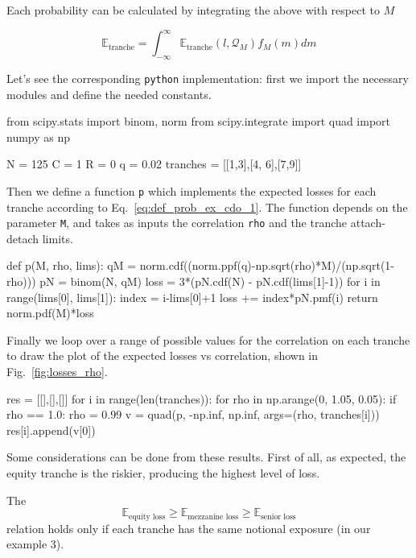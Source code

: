 Each probability can be calculated by integrating the above with respect to $M$
	
\begin{equation} 
\mathbb{E}_{\mathrm{tranche}} = \int_{-\infty}^{\infty}{\mathbb{E}_{\mathrm{tranche}}(l, \mathcal{Q}_M) f_M(m)dm}
\end{equation}

Let's see the corresponding \texttt{python} implementation: first we import the necessary modules and define the needed constants.

\begin{ipython}
from scipy.stats import binom, norm
from scipy.integrate import quad
import numpy as np

N = 125
C = 1
R = 0
q = 0.02
tranches = [[1,3],[4, 6],[7,9]]
\end{ipython}

Then we define a function \texttt{p} which implements the expected losses for each tranche according to Eq.~\ref{eq:def_prob_ex_cdo_1}.
The function depends on the parameter \texttt{M}, and takes as inputs the correlation \texttt{rho} and the tranche attach-detach limits.
	
\begin{ipython}
def p(M, rho, lims):
    qM = norm.cdf((norm.ppf(q)-np.sqrt(rho)*M)/(np.sqrt(1-rho)))
    pN = binom(N, qM)
    loss = 3*(pN.cdf(N) - pN.cdf(lims[1]-1))
    for i in range(lims[0], lims[1]):
        index = i-lims[0]+1
        loss += index*pN.pmf(i)
    return norm.pdf(M)*loss
\end{ipython}

Finally we loop over a range of possible values for the correlation on each tranche to draw the plot of the expected losses vs correlation, shown in Fig.~\ref{fig:losses_rho}.

\begin{ipython}
res = [[],[],[]]
for i in range(len(tranches)):
    for rho in np.arange(0, 1.05, 0.05):
        if rho == 1.0:
            rho = 0.99
        v = quad(p, -np.inf, np.inf, args=(rho, tranches[i]))
        res[i].append(v[0])
\end{ipython}

Some considerations can be done from these results. First of all, as expected, the equity tranche is the riskier, producing the highest level of loss. 

The 
\begin{equation}
\mathbb{E}_{\textrm{equity loss}} \ge \mathbb{E}_{\textrm{mezzanine loss}} \ge \mathbb{E}_{\textrm{senior loss}}
\end{equation}
relation holds only if each tranche has the same notional exposure (in our example 3).


